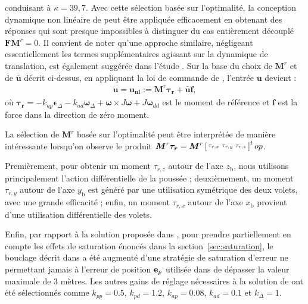 conduisant à $\kappa = 39,7$. Avec cette sélection basée sur l'optimalité, la conception dynamique non linéaire de \cite{2020e-MicCenZacFra} peut être appliquée efficacement en obtenant des réponses qui sont presque impossibles à distinguer du cas entièrement découplé 
$\boldsymbol{F}\boldsymbol{M}^r=0$. Il convient de noter qu'une approche similaire, négligeant essentiellement les termes supplémentaires agissant sur la dynamique de translation, est également suggérée dans l'étude \cite{hamel_minhduc}. 
Sur la base du choix de $\boldsymbol{M}^r$ et de $\boldsymbol{\bar u}$ décrit ci-dessus, en appliquant la loi de commande de \cite[eqn (19)]{2020e-MicCenZacFra}, l'entrée $\boldsymbol{u}$ devient :
\begin{align}
\label{eq:u_nonlin}
    \boldsymbol{u} = \boldsymbol{u_{\text{nl}}} := \boldsymbol{M}^r \boldsymbol{\tau_{r}} + \boldsymbol{\bar u} \boldsymbol{f},
\end{align}
où $\boldsymbol{\tau_{r}} = -k_{ap} \boldsymbol{\epsilon}_{\Delta} - k_{ad} \boldsymbol{\omega}_{\Delta} + \boldsymbol{\omega} \times J \boldsymbol{\omega} + J \boldsymbol{\omega}_{dd}$ est le moment de référence et $\boldsymbol{f}$ est la force dans la direction de zéro moment. 

La sélection de $\boldsymbol{M}^r$ basée sur l'optimalité peut être interprétée de manière intéressante lorsqu'on observe le produit $\boldsymbol{M}^r \boldsymbol{\tau_{r}} = \boldsymbol{M}^r \left[ \begin{smallmatrix}\tau_{r,x} & \tau_{r,y} & \tau_{r,z} \end{smallmatrix} \right]^top$. 

Premièrement, pour obtenir un moment $\tau_{r,z}$ autour de l'axe $z_{\text{b}}$, nous utilisons principalement l'action différentielle de la poussée ; deuxièmement, un moment $\tau_{r,y}$ autour de l'axe $y_{\text{b}}$ est généré par une utilisation symétrique des deux volets, avec une grande efficacité ; enfin, un moment $\tau_{r,x}$ autour de l'axe $x_{\text{b}}$ provient d'une utilisation différentielle des volets. 

Enfin, par rapport à la solution proposée dans \cite{2020e-MicCenZacFra}, pour prendre partiellement en compte les effets de saturation énoncés dans la section~\ref{sec:saturation}, le bouclage décrit dans \cite{2020e-MicCenZacFra} a été augmenté d'une stratégie de saturation d'erreur ne permettant jamais à l'erreur de position $\boldsymbol{\rm e}_p$ utilisée dans \cite[eqn. (22)]{2020e-MicCenZacFra} de dépasser la valeur maximale de 3 mètres. Les autres gains de réglage nécessaires à la solution de \cite{2020e-MicCenZacFra} ont été sélectionnés comme $k_{pp} = 0.5$, $k_{pd} = 1.2$, $k_{ap} = 0.08$, $k_{ad} = 0.1$ et $k_{\Delta} = 1$.
 
